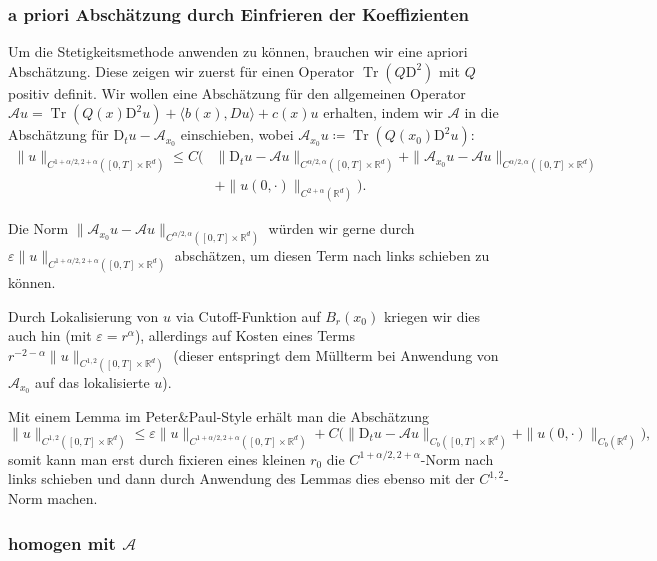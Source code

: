 \documentclass[11pt,a4paper]{scrartcl}
\newcommand{\R}{\mathbb{R}} %
\newcommand{\A}{\mathcal{A}}
\theoremstyle{plain}
\theoremstyle{definition}
\theoremstyle{remark}
\DeclareMathOperator{\Tr}{Tr}
\begin{document}
\subsubsection{a priori Abschätzung durch Einfrieren der Koeffizienten}

Um die Stetigkeitsmethode anwenden zu können, brauchen wir eine apriori Abschätzung. Diese zeigen wir zuerst für einen Operator $\Tr(Q\mathrm{D}^2)$ mit $Q$ positiv definit. Wir wollen eine Abschätzung für den allgemeinen Operator $\A u = \Tr(Q(x)\mathrm{D}^2 u) + \langle b(x), Du\rangle + c(x)u$ erhalten, indem wir $\A$ in die Abschätzung für $\mathrm{D}_t u-\A_{x_0}$ einschieben, wobei $\A_{x_0} u\coloneqq \Tr(Q(x_0)\mathrm{D}^2 u)$: 
%
\begin{align*}
\|u\|_{C^{1+\alpha/2,2+\alpha}([0,T]\times \R^d)} 
\leq C\big( & \|\mathrm{D}_t u-\A u\|_{C^{\alpha/2,\alpha}([0,T]\times \R^d)} 
+ \|\A_{x_0} u-\A u\|_{C^{\alpha/2,\alpha}([0,T]\times \R^d)} \\
 & 
+ \|u(0,\cdot)\|_{C^{2+\alpha}(\R^d)}
\big).\end{align*}

Die Norm $\|\A_{x_0} u-\A u\|_{C^{\alpha/2,\alpha}([0,T]\times \R^d)}$ würden wir gerne durch $\varepsilon \|u\|_{C^{1+\alpha/2,2+\alpha}([0,T]\times \R^d)}$ abschätzen, um diesen Term nach links schieben zu können.

Durch Lokalisierung von $u$ via Cutoff-Funktion auf $B_r(x_0)$ kriegen wir dies auch hin (mit $\varepsilon=r^\alpha$), allerdings auf Kosten eines Terms $r^{-2-\alpha}\|u\|_{C^{1,2}([0,T]\times \R^d)}$ (dieser entspringt dem Müllterm bei Anwendung von $\A_{x_0}$ auf das lokalisierte $u$).

Mit einem Lemma im Peter\&Paul-Style erhält man die Abschätzung $$\|u\|_{C^{1,2}([0,T]\times \R^d)} \leq \varepsilon \|u\|_{C^{1+\alpha/2,2+\alpha}([0,T]\times \R^d)} + C \big( \|\mathrm{D}_t u-\A u\|_{C_b([0,T]\times \R^d)} + \|u(0,\cdot)\|_{C_b(\R^d)} \big),$$ somit kann man erst durch fixieren eines kleinen $r_0$ die $C^{1+\alpha/2,2+\alpha}$-Norm nach links schieben und dann durch Anwendung des Lemmas dies ebenso mit der $C^{1,2}$-Norm machen.

\subsubsection{homogen mit $\A$}
\end{document}
